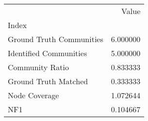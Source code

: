 \begin{tabular}{lr}
\toprule
{} &     Value \\
Index                    &           \\
\midrule
Ground Truth Communities &  6.000000 \\
Identified Communities   &  5.000000 \\
Community Ratio          &  0.833333 \\
Ground Truth Matched     &  0.333333 \\
Node Coverage            &  1.072644 \\
NF1                      &  0.104667 \\
\bottomrule
\end{tabular}
